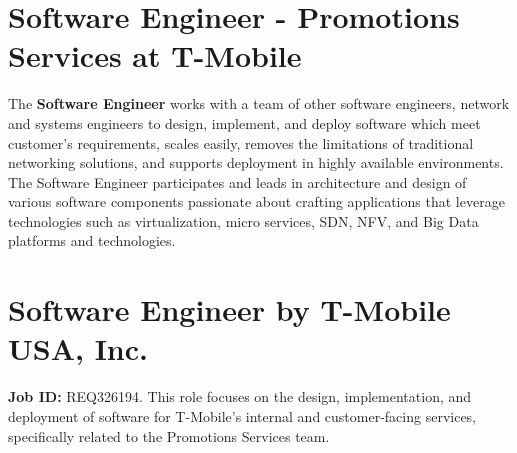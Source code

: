 \documentclass[11pt]{article}
\begin{document}



\section*{Software Engineer - Promotions Services at T-Mobile}

The \textbf{Software Engineer} works with a team of other software engineers, 
network and systems engineers to design, implement, and deploy software which 
meet customer's requirements, scales easily, removes the limitations of 
traditional networking solutions, and supports deployment in highly available 
environments. The Software Engineer participates and leads in architecture 
and design of various software components passionate about crafting 
applications that leverage technologies such as virtualization, micro 
services, SDN, NFV, and Big Data platforms and technologies.

\section*{Software Engineer by \textbf{T-Mobile USA, Inc.}}
\textbf{Job ID:} REQ326194. This role focuses on the design, implementation, 
and deployment of software for T-Mobile's internal and customer-facing 
services, specifically related to the Promotions Services team.
\end{document}
